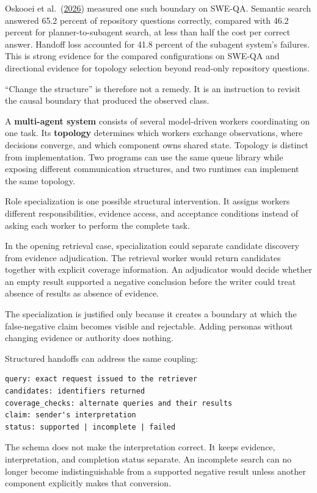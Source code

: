 Oskooei et al.~(\href{https://arxiv.org/abs/2608.01507}{2026}) measured one such boundary on SWE-QA. Semantic search answered 65.2 percent of repository questions correctly, compared with 46.2 percent for planner-to-subagent search, at less than half the cost per correct answer. Handoff loss accounted for 41.8 percent of the subagent system's failures. This is strong evidence for the compared configurations on SWE-QA and directional evidence for topology selection beyond read-only repository questions.

``Change the structure'' is therefore not a remedy. It is an instruction to revisit the causal boundary that produced the observed class.

A \textbf{multi-agent system} consists of several model-driven workers coordinating on one task. Its \textbf{topology} determines which workers exchange observations, where decisions converge, and which component owns shared state. Topology is distinct from implementation. Two programs can use the same queue library while exposing different communication structures, and two runtimes can implement the same topology.

Role specialization is one possible structural intervention. It assigns workers different responsibilities, evidence access, and acceptance conditions instead of asking each worker to perform the complete task.

In the opening retrieval case, specialization could separate candidate discovery from evidence adjudication. The retrieval worker would return candidates together with explicit coverage information. An adjudicator would decide whether an empty result supported a negative conclusion before the writer could treat absence of results as absence of evidence.

The specialization is justified only because it creates a boundary at which the false-negative claim becomes visible and rejectable. Adding personas without changing evidence or authority does nothing.

Structured handoffs can address the same coupling:

\begin{verbatim}
query: exact request issued to the retriever
candidates: identifiers returned
coverage_checks: alternate queries and their results
claim: sender's interpretation
status: supported | incomplete | failed
\end{verbatim}

The schema does not make the interpretation correct. It keeps evidence, interpretation, and completion status separate. An incomplete search can no longer become indistinguishable from a supported negative result unless another component explicitly makes that conversion.

